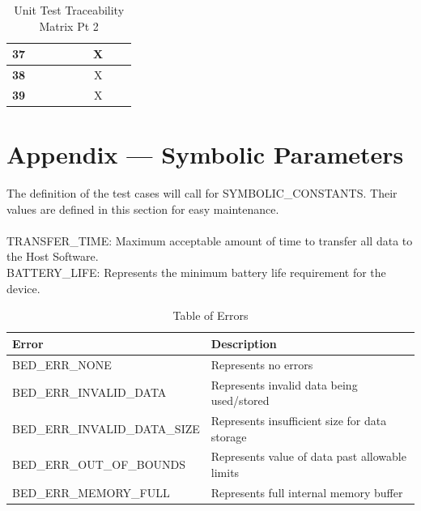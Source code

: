 \documentclass[12pt, titlepage]{article}
\begin{document}
\begin{table} [H]
\begin{tabular}{|c|c|c|c|c|c|c|c|c|}
\textbf{37} &                     &                     &                     &                     &                   &X                 &                       & \\ \hline
\textbf{38} &                     &                     &                     &                     &                   &X                  &                       & \\ \hline
\textbf{39} &                     &                     &                     &                     &                   &X                  &                       & \\ \hline
  \end{tabular}
  \caption{Unit Test Traceability Matrix Pt 2}
  \label{Table:A_Mod_trace}
\end{table}

\pagebreak




\newpage


\section*{Appendix --- Symbolic Parameters}
The definition of the test cases will call for SYMBOLIC\_CONSTANTS.
Their values are defined in this section for easy maintenance.\\\\

TRANSFER\_TIME: Maximum acceptable amount of time to transfer all data to the Host Software.\\
BATTERY\_LIFE: Represents the minimum battery life requirement for the device.\\


\begin{flushleft} 
	\begin{table}[H]
		\begin{tabular}{l l} 
			  \toprule		
				  \textbf{Error} & \textbf{Description}\\
				  \midrule 
				  BED\_ERR\_NONE 					& Represents no errors\\
				  BED\_ERR\_INVALID\_DATA			& Represents invalid data being used/stored\\
				  BED\_ERR\_INVALID\_DATA\_SIZE 		& Represents insufficient size for data storage\\
				  BED\_ERR\_OUT\_OF\_BOUNDS 		& Represents value of data past allowable limits\\
				  BED\_ERR\_MEMORY\_FULL 			& Represents full internal memory buffer\\
		
			  \bottomrule
		\end{tabular}\\
		\caption{\label{Err}Table of Errors}

	\end{table}
\end{flushleft} 
\end{document}
